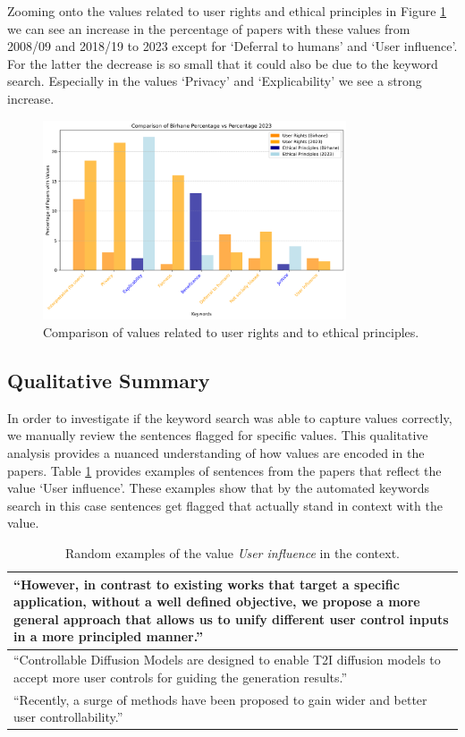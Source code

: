 \documentclass{article}
\begin{document}
Zooming onto the values related to user rights and ethical principles in Figure \ref{fig:subset_comparison_years}
we can see an increase in the percentage of papers with these values from 2008/09 and 2018/19 to 2023 except for `Deferral to humans' and `User influence'. For the latter the 
decrease is so small that it could also be due to the keyword search. Especially in the values `Privacy' and `Explicability' we see a strong increase. 
\begin{figure}[H]
    \centering
    \includegraphics[width=0.8\textwidth,height=0.32\textheight]{../plots/subset_percentage_comparison.png}
    \caption{Comparison of values related to user rights and to ethical principles.}
    \label{fig:subset_comparison_years}
\end{figure}

\subsection{Qualitative Summary}
In order to investigate if the keyword search was able to capture values correctly, we manually review 
the sentences flagged for specific values. This qualitative analysis provides a nuanced understanding of how values are encoded in the papers. 
Table \ref{tab:qualitative_examples_user_influence} provides examples of sentences from the papers that reflect the value `User influence'. These
examples show that by the automated keywords search in this case sentences get flagged that actually stand in context with the value. 
\begin{table}[H]
    \centering
    \begin{tabular}{p{12cm}}
        \toprule
        ``However, in contrast to existing works that target a specific application, without a well defined objective, we propose a more general approach that allows us to unify different user control inputs in a more principled manner.'' \\
        \midrule
        ``Controllable Diffusion Models are designed to enable T2I diffusion models to accept more user controls for guiding the generation results.'' \\
        \midrule
        ``Recently, a surge of methods have been proposed to gain wider and better user controllability.'' \\
        \bottomrule
    \end{tabular}
    \caption{Random examples of the value \textit{User influence} in the context.}
    \label{tab:qualitative_examples_user_influence}
\end{table}
\end{document}
